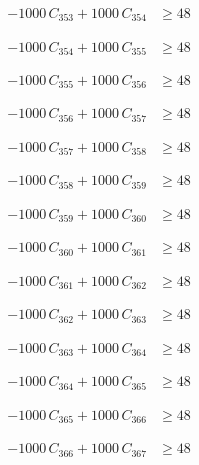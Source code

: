 \documentclass[a4paper,11pt]{article}
\begin{document}
\begin{align}
-1000\,C_{353} + 1000\,C_{354} &\geq 48 \nonumber
\end{align}

\begin{align}
-1000\,C_{354} + 1000\,C_{355} &\geq 48 \nonumber
\end{align}

\begin{align}
-1000\,C_{355} + 1000\,C_{356} &\geq 48 \nonumber
\end{align}

\begin{align}
-1000\,C_{356} + 1000\,C_{357} &\geq 48 \nonumber
\end{align}

\begin{align}
-1000\,C_{357} + 1000\,C_{358} &\geq 48 \nonumber
\end{align}

\begin{align}
-1000\,C_{358} + 1000\,C_{359} &\geq 48 \nonumber
\end{align}

\begin{align}
-1000\,C_{359} + 1000\,C_{360} &\geq 48 \nonumber
\end{align}

\begin{align}
-1000\,C_{360} + 1000\,C_{361} &\geq 48 \nonumber
\end{align}

\begin{align}
-1000\,C_{361} + 1000\,C_{362} &\geq 48 \nonumber
\end{align}

\begin{align}
-1000\,C_{362} + 1000\,C_{363} &\geq 48 \nonumber
\end{align}

\begin{align}
-1000\,C_{363} + 1000\,C_{364} &\geq 48 \nonumber
\end{align}

\begin{align}
-1000\,C_{364} + 1000\,C_{365} &\geq 48 \nonumber
\end{align}

\begin{align}
-1000\,C_{365} + 1000\,C_{366} &\geq 48 \nonumber
\end{align}

\begin{align}
-1000\,C_{366} + 1000\,C_{367} &\geq 48 \nonumber
\end{align}
\end{document}
